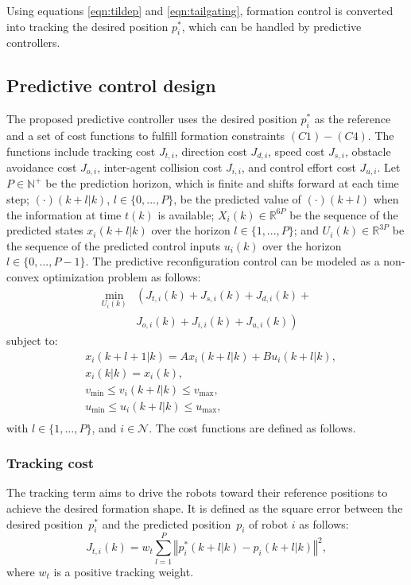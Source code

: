 Using equations \eqref{eqn:tildep} and \eqref{eqn:tailgating}, formation control is converted into tracking the desired position $p_i^*$, which can be handled by predictive controllers. 

\subsection{Predictive control design} 
The proposed predictive controller uses the desired position $p_i^*$ as the reference and a set of cost functions to fulfill formation constraints $(C1)-(C4)$. The functions include tracking cost $J_{t,i}$, direction cost $J_{d,i}$, speed cost $J_{s,i}$, obstacle avoidance cost $J_{o,i}$, inter-agent collision cost $J_{i,i}$, and control effort cost $J_{u,i}$. Let $P\in\mathbb{N}^+$ be the prediction horizon, which is finite and shifts forward at each time step; $(\cdot)(k+l|k )$, $l \in\{0,...,P\}$, be the predicted value of $(\cdot)(k+l )$ when the information at time $t(k)$ is available; $X_i(k)\in\mathbb{R}^{6P}$ be the sequence of the predicted states $x_i(k+l|k)$ over the horizon $l\in\{1,...,P\}$; and $U_i(k)\in\mathbb{R}^{3P}$ be the sequence of the predicted control inputs $u_i(k)$ over the horizon $l\in\{0,...,P-1\}$. The predictive reconfiguration control can be modeled as a non-convex optimization problem as follows:
\begin{equation}
\begin{aligned}
    \min_{U_i(k)}&\left(J_{t,i}(k)+J_{s,i}(k)+J_{d,i}(k)+\right.\\
    &\left.J_{o,i}(k)+J_{i,i}(k)+J_{u,i}(k)\right)
\end{aligned}
    \label{eqn:J}
\end{equation}
subject to:
\begin{equation}
    \begin{aligned}
        &x_i(k+l+1|k)=Ax_i(k+l|k)+Bu_i(k+l|k),\\
        &x_i(k|k)=x_i(k),\\
        &v_\text{min}\leq v_i(k+l|k)\leq v_\text{max},\\
        &u_\text{min}\leq u_i(k+l|k)\leq u_\text{max},\\
    \end{aligned}
    \label{eqn:constraints}
\end{equation}
with $l\in\{1,...,P\}$, and $i\in\mathcal{N}$. The cost functions are defined as follows.

\subsubsection{Tracking cost}\label{sec:tracking_term}
The tracking term aims to drive the robots toward their reference positions to achieve the desired formation shape. It is defined as the square error between the desired position~$p_i^*$ and the predicted position~$p_i$ of robot $i$ as follows:
\begin{equation}
    J_{t,i}(k)=w_t\sum_{l=1}^P{\left\Vert p^*_i(k+l|k)-p_i(k+l|k)\right\Vert^2},
\end{equation}
where $w_t$ is a positive tracking weight.

